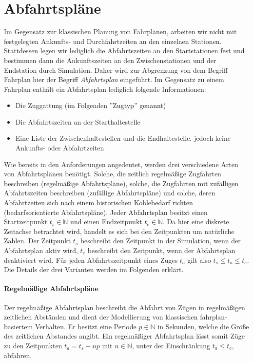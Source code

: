 \section{Abfahrtspläne}

Im Gegensatz zur klassischen Planung von Fahrplänen, arbeiten wir nicht mit festgelegten Ankunfts- und Durchfahrtzeiten an den einzelnen Stationen. Stattdessen legen wir lediglich die Abfahrtszeiten an den Startstationen fest und bestimmen dann die Ankunftszeiten an den Zwischenstationen und der Endstation durch Simulation. Daher wird zur Abgrenzung von dem Begriff Fahrplan hier der Begriff \emph{Abfahrtsplan} eingeführt. Im Gegensatz zu einem Fahrplan enthält ein Abfahrtsplan lediglich folgende Informationen:
\begin{itemize}
    \item Die Zuggattung (im Folgenden ''Zugtyp'' genannt)
    \item Die Abfahrtszeiten an der Starthaltestelle
    \item Eine Liste der Zwischenhaltestellen und die Endhaltestelle, jedoch keine Ankunfts- oder Abfahrtzeiten
\end{itemize}
 Wie bereits in den Anforderungen angedeutet, werden drei verschiedene Arten von Abfahrtsplänen benötigt. Solche, die zeitlich regelmäßige Zugfahrten beschreiben (regelmäßige Abfahrtspläne), solche, die Zugfahrten mit zufälligen Abfahrtszeiten beschreiben (zufällige Abfahrtspläne) und solche, deren Abfahrtzeiten sich nach einem historischen Kohlebedarf richten (bedarfsorientierte Abfahrtspläne). Jeder Abfahrtsplan besitzt einen Startzeitpunkt $t_s \in \mathbb{N}$ und einen Endzeitpunkt $t_e \in \mathbb{N}$. Da hier eine diskrete Zeitachse betrachtet wird, handelt es sich bei den Zeitpunkten um natürliche Zahlen. Der Zeitpunkt $t_s$ beschreibt den Zeitpunkt in der Simulation, wenn der Abfahrtsplan aktiv wird, $t_e$ beschreibt den Zeitpunkt, wenn der Abfahrtsplan deaktiviert wird. Für jeden Abfahrtszeitpunkt eines Zuges $t_a$ gilt also $t_s\leq t_a \leq t_e$. Die Details der drei Varianten werden im Folgenden erklärt.

\paragraph*{Regelmäßige Abfahrtspläne}

Der regelmäßige Abfahrtsplan beschreibt die Abfahrt von Zügen in regelmäßigen zeitlichen Abständen und dient der Modellierung von klassischen fahrplan-basiertem Verhalten. Er besitzt eine Periode $p\in\mathbb{N}$ in Sekunden, welche die Größe des zeitlichen Abstandes angibt. Ein regelmäßiger Abfahrtsplan lässt somit Züge zu den Zeitpunkten $t_a=t_s+np$ mit $n\in\mathbb{N}$, unter der Einschränkung $t_a\leq t_e$, abfahren.

